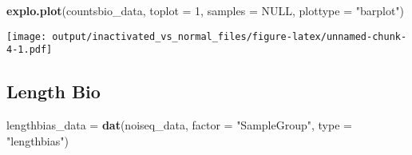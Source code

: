 \documentclass[]{article}
\newenvironment{Shaded}{\begin{snugshade}}{\end{snugshade}}
\newcommand{\KeywordTok}[1]{\textcolor[rgb]{0.13,0.29,0.53}{\textbf{#1}}}
\newcommand{\DataTypeTok}[1]{\textcolor[rgb]{0.13,0.29,0.53}{#1}}
\newcommand{\DecValTok}[1]{\textcolor[rgb]{0.00,0.00,0.81}{#1}}
\newcommand{\StringTok}[1]{\textcolor[rgb]{0.31,0.60,0.02}{#1}}
\newcommand{\OtherTok}[1]{\textcolor[rgb]{0.56,0.35,0.01}{#1}}
\newcommand{\NormalTok}[1]{#1}
\begin{document}
\begin{Shaded}
\begin{Highlighting}[]
\KeywordTok{explo.plot}\NormalTok{(countsbio_data, }\DataTypeTok{toplot =} \DecValTok{1}\NormalTok{, }\DataTypeTok{samples =} \OtherTok{NULL}\NormalTok{, }\DataTypeTok{plottype =} \StringTok{"barplot"}\NormalTok{)}
\end{Highlighting}
\end{Shaded}

\texttt{[image: output/inactivated\_vs\_normal\_files/figure-latex/unnamed-chunk-4-1.pdf]}

\subsection{Length Bio}\label{length-bio}

\begin{Shaded}
\begin{Highlighting}[]
\NormalTok{lengthbias_data =}\StringTok{ }\KeywordTok{dat}\NormalTok{(noiseq_data, }\DataTypeTok{factor =} \StringTok{"SampleGroup"}\NormalTok{, }\DataTypeTok{type =} \StringTok{"lengthbias"}\NormalTok{)}
\end{Highlighting}
\end{Shaded}
\end{document}

